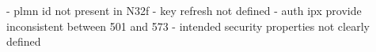 - plmn id not present in N32f
- key refresh not defined
- auth ipx provide inconsistent between 501 and 573
- intended security properties not clearly defined

